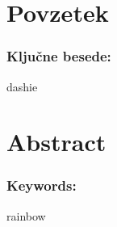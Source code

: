 \chapter*{Povzetek}


\subsection*{Ključne besede:}

dashie

\clearemptydoublepage

\chapter*{Abstract}



\subsection*{Keywords:}

rainbow

